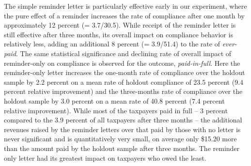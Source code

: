 \documentclass[12pt]{article}
\begin{document}
The simple reminder letter is particularly effective early in our
experiment, where the pure effect of a reminder increases the rate of
compliance after one month by approximately 12 percent (= 3.7/30.5).
While receipt of the reminder letter is still effective after three
months, its overall impact on compliance behavior is relatively less,
adding an additional 8 percent (= 3.9/51.4) to the rate of
\textit{ever-paid}.  The same statistical significance and declining
rate of overall impact of reminder-only on compliance is observed for
the outcome, \textit{paid-in-full}.  Here the reminder-only letter
increases the one-month rate of compliance over the holdout sample by
2.2 percent on a mean rate of holdout compliance of 23.5 percent (9.4
percent relative improvement) and the three-months rate of compliance
over the holdout sample by 3.0 percent on a mean rate of 40.8 percent
(7.4 percent relative improvement). While most of the taxpayers paid
in full -- 3 percent compared to the 3.9 percent of all taxpayers
after three months -- the additional revenues raised by the reminder
letters over that paid by those with no letter is never significant
and is quantitatively very small, on average only \$15.20 more than
the amount paid by the holdout sample after three months. The reminder
only letter had its greatest impact on taxpayers who owed the least.
\end{document}
